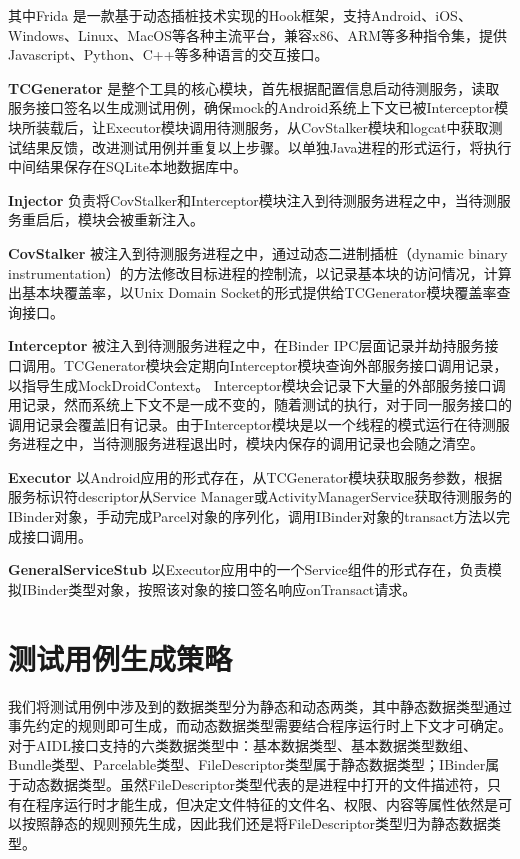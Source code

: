 \documentclass[winfonts,master,twoside]{njuthesis}
\begin{document}
其中Frida \cite{frida}是一款基于动态插桩技术实现的Hook框架，支持Android、iOS、Windows、Linux、MacOS等各种主流平台，兼容x86、ARM等多种指令集，提供Javascript、Python、C++等多种语言的交互接口。

\textbf{TCGenerator} \quad 是整个工具的核心模块，首先根据配置信息启动待测服务，读取服务接口签名以生成测试用例，确保mock的Android系统上下文已被Interceptor模块所装载后，让Executor模块调用待测服务，从CovStalker模块和logcat中获取测试结果反馈，改进测试用例并重复以上步骤。以单独Java进程的形式运行，将执行中间结果保存在SQLite本地数据库中。

\textbf{Injector} \quad 负责将CovStalker和Interceptor模块注入到待测服务进程之中，当待测服务重启后，模块会被重新注入。

\textbf{CovStalker} \quad 被注入到待测服务进程之中，通过动态二进制插桩（dynamic binary instrumentation）的方法修改目标进程的控制流，以记录基本块的访问情况，计算出基本块覆盖率，以Unix Domain Socket的形式提供给TCGenerator模块覆盖率查询接口。

\textbf{Interceptor} \quad 被注入到待测服务进程之中，在Binder IPC层面记录并劫持服务接口调用。TCGenerator模块会定期向Interceptor模块查询外部服务接口调用记录，以指导生成MockDroidContext。
Interceptor模块会记录下大量的外部服务接口调用记录，然而系统上下文不是一成不变的，随着测试的执行，对于同一服务接口的调用记录会覆盖旧有记录。由于Interceptor模块是以一个线程的模式运行在待测服务进程之中，当待测服务进程退出时，模块内保存的调用记录也会随之清空。

\textbf{Executor} \quad 以Android应用的形式存在，从TCGenerator模块获取服务参数，根据服务标识符descriptor从Service Manager或ActivityManagerService获取待测服务的IBinder对象，手动完成Parcel对象的序列化，调用IBinder对象的transact方法以完成接口调用。

\textbf{GeneralServiceStub} \quad 以Executor应用中的一个Service组件的形式存在，负责模拟IBinder类型对象，按照该对象的接口签名响应onTransact请求。


\section{测试用例生成策略}

我们将测试用例中涉及到的数据类型分为静态和动态两类，其中静态数据类型通过事先约定的规则即可生成，而动态数据类型需要结合程序运行时上下文才可确定。对于AIDL接口支持的六类数据类型中：基本数据类型、基本数据类型数组、Bundle类型、Parcelable类型、FileDescriptor类型属于静态数据类型；IBinder属于动态数据类型。虽然FileDescriptor类型代表的是进程中打开的文件描述符，只有在程序运行时才能生成，但决定文件特征的文件名、权限、内容等属性依然是可以按照静态的规则预先生成，因此我们还是将FileDescriptor类型归为静态数据类型。
\end{document}

